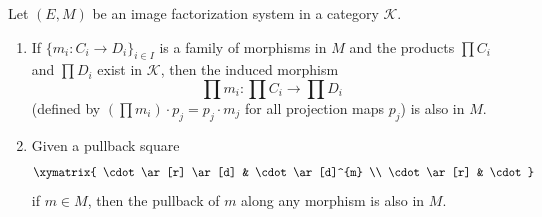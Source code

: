Let $(E, M)$ be an image factorization system in a category $\mathcal{K}$.

\begin{enumerate}
\item[(i)] If $\{m_i: C_i \longrightarrow D_i\}_{i \in I}$ is a family of morphisms in $M$ and the products $\prod C_i$ and $\prod D_i$ exist in $\mathcal{K}$, then the induced morphism
$$\prod m_i: \prod C_i \longrightarrow \prod D_i$$
(defined by $(\prod m_i) \cdot p_j = p_j \cdot m_j$ for all projection maps $p_j$) is also in $M$.

\item[(ii)] Given a pullback square
$$\xymatrix{
\cdot \ar[r] \ar[d] & \cdot \ar[d]^{m} \\
\cdot \ar[r] & \cdot
}$$
if $m \in M$, then the pullback of $m$ along any morphism is also in $M$.
\end{enumerate}

